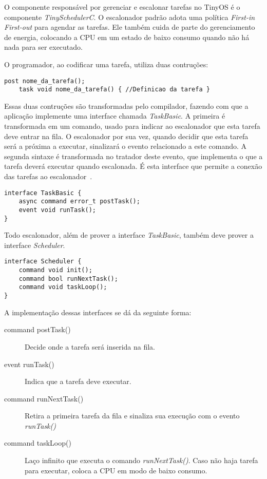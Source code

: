 O componente responsável por gerenciar e escalonar tarefas no TinyOS é o componente {\em TinySchedulerC}.
O escalonador padrão adota uma política {\em First-in First-out} para agendar as tarefas. Ele também
cuida de parte do gerenciamento de energia, colocando a CPU em um estado de baixo consumo quando
não há nada para ser executado.

O programador, ao codificar uma tarefa, utiliza duas contruções:
\begin{lstlisting}[frame=none]
    post nome_da_tarefa();
    task void nome_da_tarefa() { //Definicao da tarefa }
\end{lstlisting}
Essas duas contruções são transformadas pelo compilador, fazendo com que a aplicação implemente uma interface chamada \textit{TaskBasic}.
A primeira é transformada em um comando, usado para indicar ao escalonador que esta tarefa deve entrar na fila.
O escalonador por sua vez, quando decidir que esta tarefa será a próxima a executar, sinalizará o evento relacionado a
este comando.
A segunda sintaxe é transformada no tratador deste evento, que implementa o que a tarefa deverá executar quando
escalonada.
É esta interface que permite a conexão das tarefas ao escalonador~\cite{LevisGay/09}.
\begin{lstlisting}
interface TaskBasic {
    async command error_t postTask();
    event void runTask();
}
\end{lstlisting}

Todo escalonador, além de prover a interface \textit{TaskBasic}, também deve prover a interface \textit{Scheduler}.
\begin{lstlisting}
interface Scheduler {
    command void init();
    command bool runNextTask();
    command void taskLoop();
}
\end{lstlisting}
A implementação dessas interfaces se dá da seguinte forma:
\begin{description}
    \item[command postTask()] Decide onde a tarefa será inserida na fila.
    \item[event runTask()] Indica que a tarefa deve executar.
    \item[command runNextTask()] Retira a primeira tarefa da fila e sinaliza sua execução com o evento
    \textit{runTask()}
    \item[command taskLoop()] Laço infinito que executa o comando \textit{runNextTask()}. Caso não haja tarefa para
    executar, coloca a CPU em modo de baixo consumo. 
\end{description}

